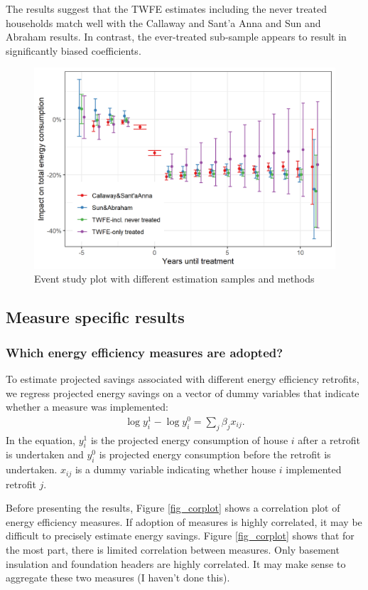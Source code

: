 \documentclass{article}
\begin{document}
The results suggest that the TWFE estimates including the never treated households match well with the Callaway and Sant'a Anna and Sun and Abraham results.  In contrast, the ever-treated sub-sample appears to result in significantly biased coefficients.

\begin{figure}
	\includegraphics{../output_figures_tables/event_study_plot}
	\caption{Event study plot with different estimation samples and methods}\label{fig_esplot}
\end{figure}


\subsection{Measure specific results}

\subsubsection{Which energy efficiency measures are adopted?}
To estimate projected savings associated with different energy efficiency retrofits, we regress projected energy savings on a vector of dummy variables that indicate whether a measure was implemented:
\begin{align}
	\log y^1_i - \log y^0_i = \sum_j \beta_j x_{ij}.
\end{align}
In the equation, $y^1_i$ is the projected energy consumption of house $i$ after a retrofit is undertaken and $y^0_i$ is projected energy consumption before the retrofit is undertaken. $x_{ij}$ is a dummy variable indicating whether house $i$ implemented retrofit $j$.

Before presenting the results, Figure \ref{fig_corplot} shows a correlation plot of energy efficiency measures. If adoption of measures is highly correlated, it may be difficult to precisely estimate energy savings.  Figure \ref{fig_corplot} shows that for the most part, there is limited correlation between measures.  Only basement insulation and foundation headers are highly correlated.  It may make sense to aggregate these two measures (I haven't done this).
\end{document}
